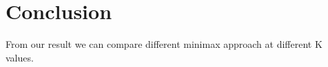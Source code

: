 \documentclass{article}
\begin{document}
\newpage
\section{Conclusion}
From our result we can compare different minimax approach at different K values.
\end{document}
